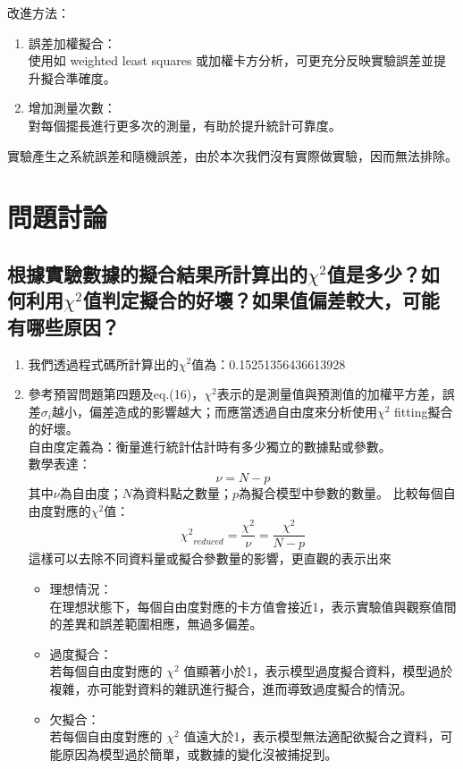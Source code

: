 \documentclass[12pt,a4paper]{article}
\begin{document}
\begin{CJK}{UTF8}{bkai}
\indent 改進方法：
\begin{enumerate}
    \item 誤差加權擬合：\\使用如 weighted least squares 或加權卡方分析，可更充分反映實驗誤差並提升擬合準確度。
    \item 增加測量次數：\\對每個擺長進行更多次的測量，有助於提升統計可靠度。
\end{enumerate}
\indent 實驗產生之系統誤差和隨機誤差，由於本次我們沒有實際做實驗，因而無法排除。


\clearpage
\section{問題討論}

\subsection{根據實驗數據的擬合結果所計算出的$\chi^2$值是多少？如何利用$\chi^2$值判定擬合的好壞？如果值偏差較大，可能有哪些原因？}
\hfill
\begin{enumerate}
    \item 我們透過程式碼所計算出的$\chi^2$值為：0.15251356436613928
    \item 參考預習問題第四題及eq.(16)，$\chi^2$表示的是測量值與預測值的加權平方差，誤差$\sigma_i$越小，偏差造成的影響越大；而應當透過自由度來分析使用$\chi^2$ fitting擬合的好壞。\\
    自由度定義為：衡量進行統計估計時有多少獨立的數據點或參數。\\
    數學表達：
    \begin{equation}
        \nu=N-p
    \end{equation}
    其中$\nu$為自由度；$N$為資料點之數量；$p$為擬合模型中參數的數量。
    比較每個自由度對應的$\chi^2$值：%
    \begin{equation}
        {\chi^2}_{reduced}=\frac{\chi^2}{\nu}=\frac{\chi^2}{N-p}
    \end{equation}
    這樣可以去除不同資料量或擬合參數量的影響，更直觀的表示出來
    \begin{itemize}
        \item 理想情況：\\在理想狀態下，每個自由度對應的卡方值會接近1，表示實驗值與觀察值間的差異和誤差範圍相應，無過多偏差。
        \item 過度擬合：\\若每個自由度對應的 $\chi^2$ 值顯著小於1，表示模型過度擬合資料，模型過於複雜，亦可能對資料的雜訊進行擬合，進而導致過度擬合的情況。
        \item 欠擬合：\\若每個自由度對應的 $\chi^2$ 值遠大於1，表示模型無法適配欲擬合之資料，可能原因為模型過於簡單，或數據的變化沒被捕捉到。
    \end{itemize}


\end{enumerate}
\end{CJK}
\end{document}
